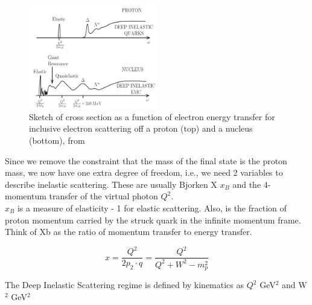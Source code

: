         \begin{figure}
            \centering
            \includegraphics[width=0.5\textwidth]{Chapters/Ch1-Intro/Ch1-Sec1-Background/pics/intro/scatcrosstheory.png}
            \caption[Scattering Cross Section vs. Energy Transfer]{Sketch of cross section as a function of electron energy transfer for inclusive electron scattering off a proton (top) and a nucleus (bottom), from \cite{Donnelly2017FoundationsPhysics} }
            \label{fig:ScatteringvsW}
        \end{figure}


        Since we remove the constraint that the mass of the final state is the proton mass, we now have one extra degree of freedom, i.e., we need 2 variables to describe inelastic scattering. These are usually Bjorken X $x_B$ and the 4-momentum transfer of the virtual photon $Q^2$.\\
        $x_B$ is a measure of elasticity - 1 for elastic scattering. Also, is the fraction of proton momentum carried by the struck quark in the infinite momentum frame.       Think of Xb as the ratio of momentum transfer to energy transfer. 
        
        \begin{equation}
            x = \frac{Q^2}{2p_2\cdot q} = \frac{Q^2}{Q^2+W^2-m_p^2}
        \end{equation}

        The Deep Inelastic Scattering regime is defined by kinematics as $Q^2$  GeV$^2$ and W$^2$ GeV$^2$
        
    


